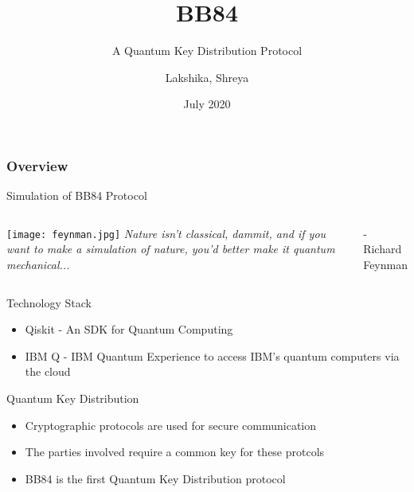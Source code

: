 \documentclass{beamer}
\title[BB84]{BB84}
\subtitle{A Quantum Key Distribution Protocol}
\author[Team 37]{Lakshika, Shreya}
\date{July 2020}
\begin{document}
\begin{frame}
	\titlepage
\end{frame}

\begin{frame}
	\frametitle{Overview}
	 Simulation of BB84 Protocol
\end{frame}


\begin{frame}[standout]
    \begin{columns}
            \centering
            \texttt{[image: feynman.jpg]}
            \emph{Nature isn’t classical, dammit, and if you want to make a simulation of nature, you’d better make it quantum mechanical...}
        \begin{flushright}
            - Richard Feynman
        \end{flushright}
    \end{columns}
\end{frame}


\begin{frame}{Technology Stack}
	\begin{itemize}
		\item Qiskit - An SDK for Quantum Computing
		\item IBM Q - IBM Quantum Experience to access IBM's quantum computers via the cloud
	\end{itemize}
\end{frame}


\begin{frame}{Quantum Key Distribution}
    \begin{itemize}[<+->] 
        \item Cryptographic protocols are used for secure communication
        \item The parties involved require a common key for these protcols
        
        \item BB84 is the first Quantum Key Distribution protocol
    \end{itemize}
\end{frame}
\end{document}
